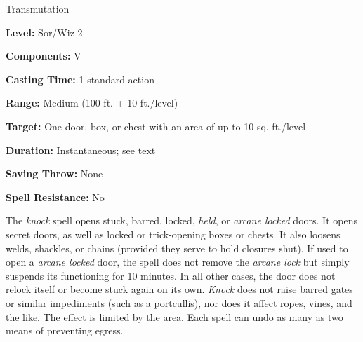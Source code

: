 
Transmutation

\textbf{Level:} Sor/Wiz 2

\textbf{Components:} V

\textbf{Casting Time:} 1 standard action

\textbf{Range:} Medium (100 ft. + 10 ft./level)

\textbf{Target:} One door, box, or chest with an area of up to 10 sq. ft./level

\textbf{Duration:} Instantaneous; see text

\textbf{Saving Throw:} None

\textbf{Spell Resistance:} No

The \textit{knock} spell opens stuck, barred, locked, \textit{held}, or \textit{arcane 
locked} doors. It opens secret doors, as well as locked or trick-opening boxes 
or chests. It also loosens welds, shackles, or chains (provided they serve to hold 
closures shut). If used to open a \textit{arcane locked} door, the spell does not 
remove the \textit{arcane lock} but simply suspends its functioning for 10 minutes. 
In all other cases, the door does not relock itself or become stuck again on its 
own. \textit{Knock} does not raise barred gates or similar impediments (such as 
a portcullis), nor does it affect ropes, vines, and the like. The effect is limited 
by the area. Each spell can undo as many as two means of preventing egress. 

